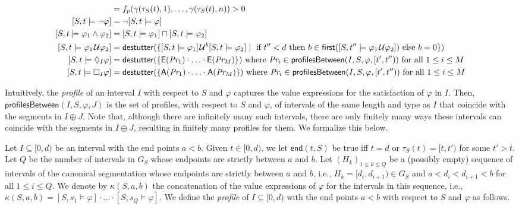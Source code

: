 \scriptsize
\begin{align*}
	[S,t \models p] &=  f_p(\gamma(\tau_S(t), 1), \ldots, \gamma(\tau_S(t), n)) > 0 \\
	[S,t \models \lnot \varphi] &= \lnot [S,t \models \varphi] \\
	[S,t \models \varphi_1 \land \varphi_2] &= [S,t \models \varphi_1] \sqcap [S,t \models \varphi_2] \\
	[S,t \models \varphi_1 \until \varphi_2] &= \destutter(\{ [S,t \models \varphi_1] \until^b [S,t \models \varphi_2] \st \text{ if $t'' < d$ then $b \in \first([S,t'' \models \varphi_1 \until \varphi_2])$ else $b = 0$} \}) \\
	[S,t \models \LTLf_I \varphi] &= \destutter(\{ \mathsf{E}(\textit{Pr}_1) \cdot \ldots \cdot \mathsf{E}(\textit{Pr}_M) \}) \text{ where $\textit{Pr}_i \in \mathsf{profilesBetween}(I, S, \varphi, [t',t''))$ for all $1 \leq i \leq M$} \\
	[S,t \models \LTLg_I \varphi] &= \destutter(\{ \mathsf{A}(\textit{Pr}_1) \cdot \ldots \cdot \mathsf{A}(\textit{Pr}_M) \}) \text{ where $\textit{Pr}_i \in \mathsf{profilesBetween}(I, S, \varphi, [t',t''))$ for all $1 \leq i \leq M$}
\end{align*}
\normalsize

Intuitively, the \emph{profile} of an interval $I$ with respect to $S$ and $\varphi$ captures the value expressions for the satisfaction of $\varphi$ in $I$.
Then, $\mathsf{profilesBetween}(I, S, \varphi, J)$ is the set of profiles, with respect to $S$ and $\varphi$, of intervals of the same length and type as $I$ that coincide with the segments in $I \oplus J$.
Note that, although there are infinitely many such intervals, there are only finitely many ways these intervals can coincide with the segments in $I \oplus J$, resulting in finitely many profiles for them.
We formalize this below.

Let $I \subseteq [0,d)$ be an interval with the end points $a < b$.
Given $t \in [0,d)$, we let $\mathsf{end}(t, S)$ be true iff $t=d$ or $\tau_S(t) = [t, t')$ for some $t' > t$.
Let $Q$ be the number of intervals in $G_S$ whose endpoints are strictly between $a$ and $b$.
Let $(H_k)_{1 \leq k \leq Q}$ be a (possibly empty) sequence of intervals of the canonical segmentation whose endpoints are strictly between $a$ and $b$, i.e., $H_k = [d_i, d_{i+1}) \in G_S$ and $a < d_i < d_{i+1} < b$ for all $1 \leq i \leq Q$.
We denote by $\kappa(S, a, b)$ the concatenation of the value expressions of $\varphi$ for the intervals in this sequence, i.e., $\kappa(S, a, b) = [S, s_1 \models \varphi] \cdot \ldots \cdot [S, s_Q \models \varphi]$.
We define the \emph{profile} of $I \subseteq [0,d)$ with the end points $a < b$ with respect to $S$ and $\varphi$ as follows.

